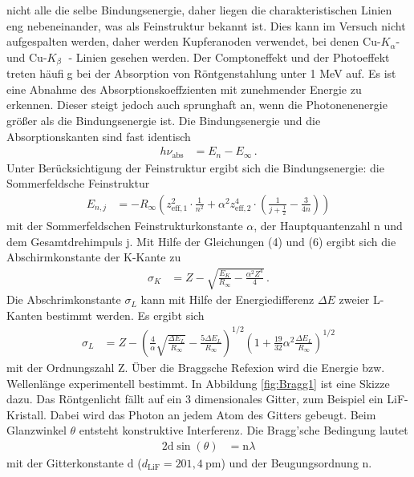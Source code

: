 nicht alle die selbe Bindungsenergie, daher liegen die charakteristischen Linien eng nebeneinander,
was als Feinstruktur bekannt ist. Dies kann im Versuch nicht aufgespalten
werden, daher werden Kupferanoden verwendet, bei denen Cu-$K_\alpha$- und Cu-$K_\beta$ - Linien
gesehen werden. Der Comptoneffekt und der Photoeffekt treten häufig bei der Absorption von Röntgenstahlung
unter 1 MeV auf. Es ist eine Abnahme des Absorptionskoeffzienten mit zunehmender
Energie zu erkennen. Dieser steigt jedoch auch sprunghaft an, wenn die Photonenenergie
größer als die Bindungsenergie ist. Die Bindungsenergie und die Absorptionskanten sind
fast identisch
\begin{align}
    h \nu_{\text{abs}} &= E_n - E_\infty \,.
\end{align}
Unter Berücksichtigung der Feinstruktur ergibt sich die Bindungsenergie: die
Sommerfeldsche Feinstruktur
\begin{align}
    E_{n,j} &= -R_\infty \left(z_{\text{eff},1}^2 \cdot \frac{1}{n^2} + \alpha^2 z_{\text{eff},2}^4 \cdot \left(\frac{1}{j+\frac{1}{2}} - \frac{3}{4n}\right)\right)
\end{align}
mit der Sommerfeldschen Feinstrukturkonstante $\alpha$, der Hauptquantenzahl n und dem
Gesamtdrehimpuls j. Mit Hilfe der Gleichungen (4) und (6) ergibt sich die Abschirmkonstante
der K-Kante zu
\begin{align}
    \sigma_K &= Z - \sqrt{\frac{E_K}{R_\infty} - \frac{\alpha^2 Z^4}{4}} \,.
\end{align}
Die Abschrimkonstante $\sigma_L$ kann mit Hilfe der Energiedifferenz $\Delta E$
zweier L-Kanten bestimmt werden. Es ergibt sich
\begin{align}
    \sigma_L &= Z - \left(\frac{4}{\alpha} \sqrt{\frac{\Delta E_L}{R_\infty}}-\frac{5 \Delta E_L}{R_\infty}\right)^{1/2} \left(1+\frac{19}{32} \alpha^2 \frac{\Delta E_L}{R_\infty}\right)^{1/2}
\end{align}
mit der Ordnungszahl Z.
Über die Braggsche Refexion wird die Energie bzw. Wellenlänge experimentell bestimmt.
In Abbildung \ref{fig:Bragg1} ist eine Skizze dazu. Das Röntgenlicht fällt auf ein 3 dimensionales
Gitter, zum Beispiel ein LiF-Kristall. Dabei wird das Photon an jedem Atom des
Gitters gebeugt. Beim Glanzwinkel $\theta$ entsteht konstruktive Interferenz. Die Bragg'sche
Bedingung lautet
\begin{align}
    \text{2d} \sin (\theta) &= \text{n} \lambda
\end{align}
mit der Gitterkonstante d ($d_{\text{LiF}}=201,4 \ \text{pm}$) und der Beugungsordnung n.
